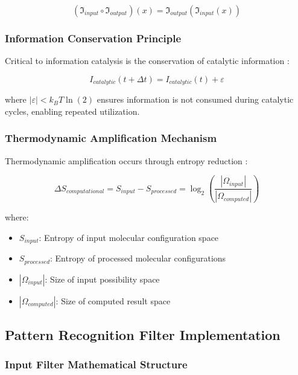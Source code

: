 \begin{equation}
(\mathfrak{I}_{input} \circ \mathfrak{I}_{output})(x) = \mathfrak{I}_{output}(\mathfrak{I}_{input}(x))
\end{equation}

\subsubsection{Information Conservation Principle}

Critical to information catalysis is the conservation of catalytic information \cite{bennett1982thermodynamics}:

\begin{equation}
I_{catalytic}(t + \Delta t) = I_{catalytic}(t) + \varepsilon
\end{equation}

where $|\varepsilon| < k_B T \ln(2)$ ensures information is not consumed during catalytic cycles, enabling repeated utilization.

\subsubsection{Thermodynamic Amplification Mechanism}

Thermodynamic amplification occurs through entropy reduction \cite{jarzynski1997nonequilibrium}:

\begin{equation}
\Delta S_{computational} = S_{input} - S_{processed} = \log_2\left(\frac{|\Omega_{input}|}{|\Omega_{computed}|}\right)
\end{equation}

where:
\begin{itemize}
\item $S_{input}$: Entropy of input molecular configuration space
\item $S_{processed}$: Entropy of processed molecular configurations
\item $|\Omega_{input}|$: Size of input possibility space
\item $|\Omega_{computed}|$: Size of computed result space
\end{itemize}

\subsection{Pattern Recognition Filter Implementation}

\subsubsection{Input Filter Mathematical Structure}

